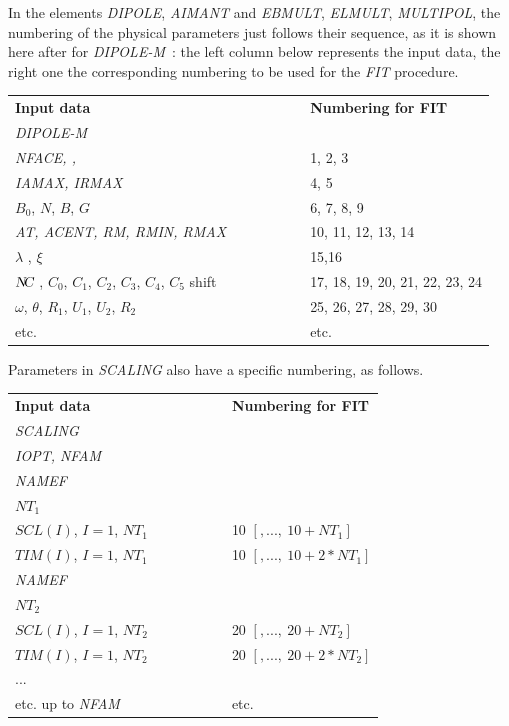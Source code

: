 \noindent In the elements  \textsl{DIPOLE}, \textsl{AIMANT} 
and \textsl{EBMULT}, \textsl{ELMULT}, \textsl{MULTIPOL}, the
numbering of the physical parameters just follows their sequence, as it is shown here after 
for \textsl{DIPOLE-M}~: the left column below represents the input data, the 
right one the corresponding numbering to be used for the \textsl{FIT} procedure. 
\begin{center}
{\renewcommand{\arraystretch}{1}
	\begin{tabular}{lcl}
	\textbf{Input  data}  &~~~~~~~~&  \textbf{Numbering  for  FIT}\\
      \textsl{DIPOLE-M}                      \\
	\textsl{NFACE,  \IC,  \IL}     &  &  1, 2, 3 \\
	\textsl{IAMAX,  IRMAX}         &&  4, 5    \\
	$B_0$, $N$, $B$, $G$  &&  6, 7, 8, 9\\
	\textsl{AT, ACENT, RM, RMIN, RMAX} &&  10, 11, 12, 13, 14 \\
	$\lambda$ , $\xi$     &&  15,16    \\
	$\textsl{N\!C }$, $C_0$, $C_1$, $C_2$, $C_3$, $C_4$, $C_5$ shift
	                      &&  17, 18, 19, 20, 21, 22, 23, 24\\
	$\omega$, $\theta$, $R_1$, $U_1$, $U_2$, $R_2$ 
	                      && 25, 26, 27, 28, 29, 30 \\
	etc.                 && etc.
	\end{tabular}   }
\end{center}

\newpage %

\noindent Parameters in \textsl{SCALING} also have a specific numbering, as follows. 
\begin{center}
{\renewcommand{\arraystretch}{1}
	\begin{tabular}{lcl}
	\textbf{Input  data}  &~~~~~~~~&  \textbf{Numbering  for  FIT}\\
      \textsl{SCALING}                      \\
	\textsl{IOPT, NFAM }      & &  \\
	\textsl{NAMEF}         &&    \\
	$NT_1$    &      &            \\
	$SCL(I)$, $I=1$, $NT_1$ &&  10 $[,...,~10+NT_1]$ \\
	$TIM(I)$, $I=1$, $NT_1$ &&  10 $[,...,~10+2*NT_1]$ \\
	\textsl{NAMEF}        & &    \\
	$NT_2$    &               &   \\
	$SCL(I)$, $I=1$, $NT_2$ &&  20 $[,...,~20+NT_2]$ \\
	$TIM(I)$, $I=1$, $NT_2$ &&  20 $[,...,~20+2*NT_2]$ \\
          {\Large...}   \\
	etc.  up to \textsl{NFAM}       &        & etc.
	\end{tabular}   }
\end{center}

